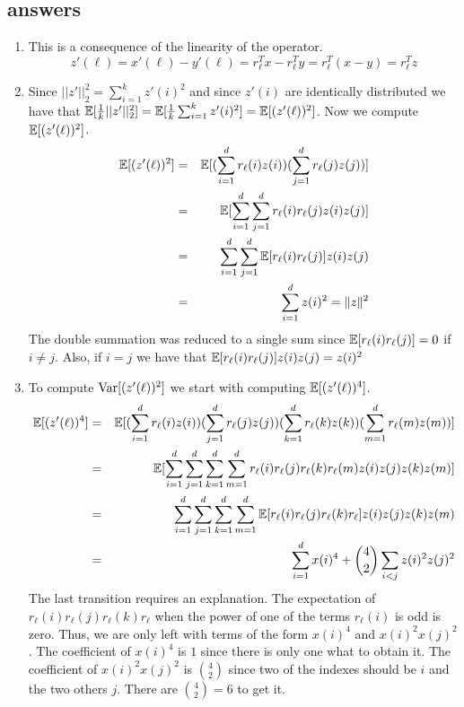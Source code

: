 \documentclass{article}
\begin{document}
\subsection*{answers}
\begin{enumerate}
\item This is a consequence of the linearity of the operator. 
\[
z'(\ell) = x'(\ell) - y'(\ell) = r_{\ell}^{T}x - r_{\ell}^{T}y = r_{\ell}^{T}(x-y) = r_{\ell}^{T}z 
\]
\item Since $||z'||_{2}^{2} = \sum_{i=1}^{k}z'(i)^2$ and since $z'(i)$ are identically distributed we have that 
${\mathbb E}[\frac{1}{k}||z'||_{2}^{2}] = {\mathbb E}[\frac{1}{k}\sum_{i=1}^{k}z'(i)^2] = {\mathbb E}[(z'(\ell))^2]$.
Now we compute ${\mathbb E}[(z'(\ell))^2]$.
\begin{eqnarray}
{\mathbb E}[(z'(\ell))^2] &=& {\mathbb E}[(\sum_{i=1}^{d} r_\ell(i) z(i))(\sum_{j=1}^{d} r_\ell(j) z(j))] \\
&=& {\mathbb E}[\sum_{i=1}^{d} \sum_{j=1}^{d} r_\ell(i) r_\ell(j)z(i) z(j)] \\
&=& \sum_{i=1}^{d} \sum_{j=1}^{d} {\mathbb E}[r_\ell(i) r_\ell(j)]z(i) z(j) \\
&=& \sum_{i=1}^{d} z(i)^2  = \|z\|^2
\end{eqnarray}
The double summation was reduced to a single sum since ${\mathbb E}[r_\ell(i)r_\ell(j)] = 0$ if $i \ne j$.
Also, if $i=j$ we have that ${\mathbb E}[r_\ell(i)r_\ell(j)]z(i)z(j) = z(i)^2$
\item To compute ${\operatorname{Var}}[(z'(\ell))^2]$ we start with computing ${\mathbb E}[(z'(\ell))^4]$.
\begin{eqnarray*}
{\mathbb E}[(z'(\ell))^4] &=& {\mathbb E}[(\sum_{i=1}^{d} r_\ell(i) z(i))(\sum_{j=1}^{d} r_\ell(j) z(j))(\sum_{k=1}^{d} r_\ell(k) z(k))(\sum_{m=1}^{d} r_\ell(m) z(m))] \\
&=& {\mathbb E}[\sum_{i=1}^{d}\sum_{j=1}^{d}\sum_{k=1}^{d}\sum_{m=1}^{d}r_\ell(i)r_\ell(j)r_\ell(k)r_\ell(m)z(i)z(j)z(k)z(m)] \\
&=& \sum_{i=1}^{d}\sum_{j=1}^{d}\sum_{k=1}^{d}\sum_{m=1}^{d} {\mathbb E}[r_\ell(i)r_\ell(j)r_\ell(k)r_\ell]z(i)z(j)z(k)z(m)\\
&=& \sum_{i=1}^{d}x(i)^4 + {4 \choose 2} \sum_{i<j}z(i)^2 z(j)^2
\end{eqnarray*}
The last transition requires an explanation. The expectation of $r_\ell(i)r_\ell(j)r_\ell(k)r_\ell$ when the power of one of 
the terms $r_\ell(i)$ is odd is zero. Thus, we are only left with terms of the form $x(i)^4$ and $x(i)^2 x(j)^2$.
The coefficient of $x(i)^4$ is $1$ since there is only one what to obtain it. The coefficient of $x(i)^2 x(j)^2$ is ${4 \choose 2}$
since two of the indexes should be $i$ and the two others $j$. There are ${4 \choose 2} = 6$ to get it.

\end{enumerate}
\end{document}
